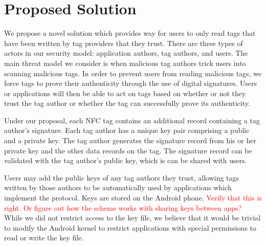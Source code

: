 \documentclass[12pt]{article}
\newcommand\TODO[1]{\textcolor{red}{#1}}
\begin{document}
\section{Proposed Solution}
% 
% 
% 
% 
% 
% 
% 
% 
% 
% 

We propose a novel solution which provides way for users to only read tags that have been written by tag providers that they trust.
There are three types of actors in our security model: application authors, tag authors, and users.
The main threat model we consider is when malicious tag authors trick users into scanning malicious tags.
In order to prevent users from reading malicious tags, we force tags to prove their authenticity through the use of digital signatures.
Users or applications will then be able to act on tags based on whether or not they trust the tag author or whether the tag can successfully prove its authenticity.

Under our proposal, each NFC tag contains an additional record containing a tag author's signature.
Each tag author has a unique key pair comprising a public and a private key.
The tag author generates the signature record from his or her private key and the other data records on the tag.
The signature record can be validated with the tag author's public key, which is can be shared with users.

Users may add the public keys of any tag authors they trust, allowing tags written by those authors to be automatically used by applications which implement the protocol.
Keys are stored on the Android phone.
\TODO{Verify that this is right. Or figure out how the scheme works with sharing keys between apps?}
While we did not restrict access to the key file, we believe that it would be trivial to modify the Android kernel to restrict applications with special permissions to read or write the key file.
\end{document}
